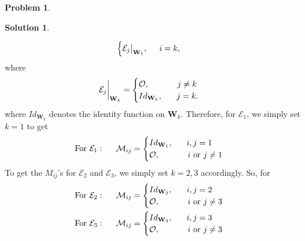 \documentclass{article}
\theoremstyle{definition}
\newtheorem*{prob*}{Problem}
\newtheorem*{sln*}{Solution}
\newcommand{\W}{\mathbf{W}}
\newcommand{\M}{\mathcal{M}}
\newcommand{\E}{\mathcal{E}}
\begin{document}
\begin{prob*}
\begin{sln*}
\begin{enumerate}
\begin{align*}
\begin{cases}
			\E_j\big\vert_{\W_1},\hspace{0.5cm} i=k,
			\end{cases}
			\end{align*}
			where 
			\begin{align*}
			\E_j\bigg\vert_{\W_k} =
			\begin{cases}
			\mathcal{O},\hspace{1.2 cm} j\neq k\\
			Id_{\W_k},\hspace{0.6cm} j=k.
			\end{cases}
			\end{align*}
			where $Id_{\W_k}$ denotes the identity function on $\W_k$. Therefore, for $\E_1$, we simply set $k=1$ to get
			\begin{align*}
			\text{For }\E_1:\hspace{0.5cm}\M_{ij} = 
			\begin{cases}
			Id_{\W_1},\hspace{0.6cm}   i,j=1\\
			\mathcal{O},\hspace{1.2cm}    i\text{ or }j\neq 1
			\end{cases}
			\end{align*}
			To get the $M_{ij}$'s for $\E_2$ and $\E_3$, we simply set $k=2,3$ accordingly. So, for 
			\begin{align*}
			&\text{For }\E_2:\hspace{0.5cm}\M_{ij} = 
			\begin{cases}
			Id_{\W_2},\hspace{0.6cm}   i,j=2\\
			\mathcal{O},\hspace{1.2cm}    i\text{ or }j\neq 3
			\end{cases}\\
			&\text{For }\E_3:\hspace{0.5cm}\M_{ij} = 
			\begin{cases}
			Id_{\W_3},\hspace{0.6cm}   i,j=3\\
			\mathcal{O},\hspace{1.2cm}    i\text{ or }j\neq 3
			\end{cases}
			\end{align*}
			
		\end{enumerate} 
		
	\end{sln*}
	
\end{prob*}
\end{document}
